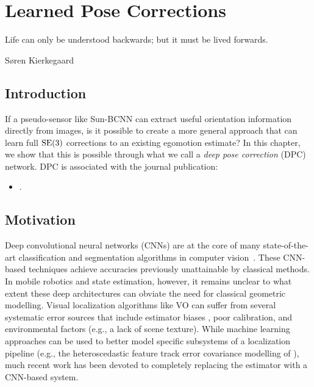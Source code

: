 \chapter{Learned Pose Corrections}
\label{ch:dpc}
\epigraph{Life can only be understood backwards; but it must be lived forwards.}{Søren Kierkegaard}

\section{Introduction}

If a pseudo-sensor like Sun-BCNN can extract useful orientation information directly from images, is it possible to create a more general approach that can learn full $\mathrm{SE}(3)$ corrections to an existing egomotion estimate? In this chapter, we show that this is possible through what we call a \textit{deep pose correction} (DPC) network. DPC is associated with the journal publication:
\begin{itemize}
\item {}.
\end{itemize}







\section{Motivation}
Deep convolutional neural networks (CNNs) are at the core of many state-of-the-art classification and segmentation algorithms in computer vision~\citep{LeCun2015-qf}. 
These CNN-based techniques achieve accuracies previously
unattainable by classical methods. In mobile robotics and state estimation, however, it remains unclear to what extent these deep architectures can obviate the need for classical geometric modelling. 
Visual localization algorithms like VO can suffer from several systematic error sources
that include estimator biases \citep{Peretroukhin2014-db}, poor calibration, and environmental factors (e.g., a lack of scene texture). While machine learning approaches can be used to better model specific subsystems of a localization pipeline (e.g., the heteroscedastic feature track error covariance modelling of \cite{Peretroukhin2016-om, 2015_Peretroukhin_PROBE}), much recent work \citep{Costante2016-hb, Clark2017, Kendall2015-ew, Melekhov2017-dl, Oliveira2017-lt} has been devoted to completely replacing the estimator with a CNN-based system.

